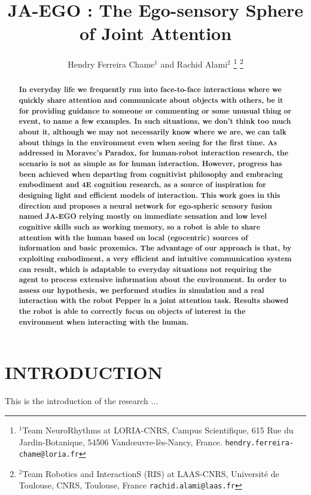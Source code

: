 \documentclass[letterpaper, 10 pt, conference]{ieeeconf}  %
\title{\LARGE \bf
	JA-EGO : The Ego-sensory Sphere of Joint Attention
}
\author{Hendry Ferreira Chame$^{1}$ and Rachid Alami$^{2}$%
	\thanks{$^{1}$Team NeuroRhythms at LORIA-CNRS, Campus Scientifique, 615 Rue du Jardin-Botanique, 54506 Vand\oe uvre-l\`es-Nancy, France.
		{\tt\small hendry.ferreira-chame@loria.fr}}%
	\thanks{$^{2}$Team Robotics and InteractionS (RIS) at LAAS-CNRS, Universit\'e de Toulouse, CNRS, Toulouse, France
		{\tt\small rachid.alami@laas.fr}}%
}
\begin{document}
		
	
	\maketitle
	\thispagestyle{empty}
	\pagestyle{empty}
	
	
	\begin{abstract}
		
		\small \bf In everyday life we frequently run into face-to-face interactions where we quickly share attention and communicate about objects with others, be it for providing guidance to someone or commenting or some unusual thing or event, to name a few examples. In such situations, we don’t think too much about it, although we may not necessarily know where we are, we can talk about things in the environment even when seeing for the first time. As addressed in Moravec's Paradox, for human-robot interaction research, the scenario is not as simple as for human interaction. However, progress has been achieved when departing from cognitivist philosophy and embracing embodiment and 4E cognition research, as a source of inspiration for designing light and efficient models of interaction. This work goes in this direction and proposes a neural network for ego-spheric sensory fusion named JA-EGO relying mostly on immediate sensation and low level cognitive skills such as working memory, so a robot is able to share attention with the human based on local (egocentric) sources of information and basic proxemics. The advantage of our approach is that, by exploiting embodiment, a very efficient and intuitive communication system can result, which is adaptable to everyday situations not requiring the agent to process extensive information about the environment. In order to assess our hypothesis, we performed studies in simulation and a real interaction with the robot Pepper in a joint attention task. Results showed the robot is able to correctly focus on objects of interest in the environment when interacting with the human.   
		
	\end{abstract}
	
	
	\section{INTRODUCTION}
	
	This is the introduction of the research ...
	
\end{document}
